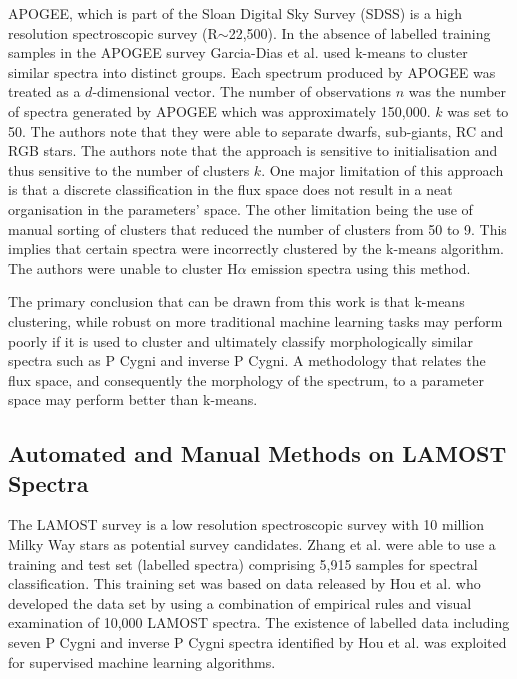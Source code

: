 APOGEE, which is part of the Sloan Digital Sky Survey (SDSS) is a high resolution spectroscopic survey (R$\sim$22,500)\cite{eisenstein2001spectroscopic}\cite{blanton2017sloan}. In the absence of labelled training samples in the APOGEE survey Garcia-Dias et al. used k-means to cluster similar spectra into distinct groups\cite{garcia2018machine}. Each spectrum produced by APOGEE was treated as a $d$-dimensional vector. The number of observations $n$ was the number of spectra generated by APOGEE which was approximately 150,000. $k$ was set to 50. The authors note that they were able to separate dwarfs, sub-giants, RC and RGB stars. The authors note that the approach is sensitive to initialisation and thus sensitive to the number of clusters $k$. One major limitation of this approach is that a discrete classification in the flux space does not result in a neat organisation in the parameters' space. The other limitation being the use of manual sorting of clusters that reduced the number of clusters from 50 to 9. This implies that certain spectra were incorrectly clustered by the k-means algorithm. The authors were unable to cluster H$\alpha$ emission spectra using this method. 

The primary conclusion that can be drawn from this work is that k-means clustering, while robust on more traditional machine learning tasks may perform poorly if it is used to cluster and ultimately classify morphologically similar spectra such as P Cygni and inverse P Cygni. A methodology that relates the flux space, and consequently the morphology of the spectrum, to a parameter space may perform better than k-means. 

\subsection{Automated and Manual Methods on LAMOST Spectra}

The LAMOST survey is a low resolution spectroscopic survey with 10 million Milky Way stars as potential survey candidates. Zhang et al. were able to use a training and test set (labelled spectra) comprising 5,915 samples for spectral classification. This training set was based on data released by Hou et al.\cite{hou2016catalog} who developed the data set by using a combination of empirical rules and visual examination of 10,000 LAMOST spectra. The existence of labelled data including seven P Cygni and inverse P Cygni spectra identified by Hou et al. was exploited for supervised machine learning algorithms. 

